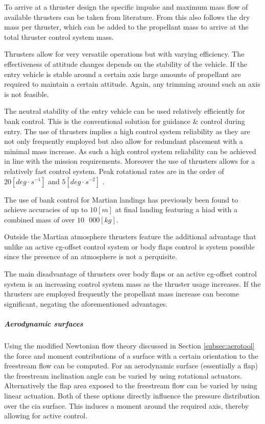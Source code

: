 To arrive at a thruster design the specific impulse and maximum mass flow of available thrusters can be taken from literature. From this also follows the dry mass per thruster, which can be added to the propellant mass to arrive at the total thruster control system mass.

Thrusters allow for very versatile operations but with varying efficiency. The effectiveness of attitude changes depends on the stability of the vehicle. If the entry vehicle is stable around a certain axis large amounts of propellant are required to maintain a certain attitude. Again, any trimming around such an axis is not feasible.

The neutral stability of the entry vehicle can be used relatively efficiently for bank control. This is the conventional solution for guidance \& control during entry. The use of thrusters implies a high control system reliability as they are not only frequently employed but also allow for redundant placement with a minimal mass increase. As such a high control system reliability can be achieved in line with the mission requirements. Moreover the use of thrusters allows for a relatively fast control system. Peak rotational rates are in the order of $20 \left[deg\cdot s^{-1}\right]$ and $5 \left[deg \cdot s^{-2}\right]$ \cite{Davis2010}.

The use of bank control for Martian landings has previously been found \cite{Davis2010} to achieve accuracies of up to $10 \left[m\right]$ at final landing featuring a \gls{hiad} with a combined mass of over $10\mbox{ }000 \left[kg\right]$.

Outside the Martian atmosphere thrusters feature the additional advantage that unlike an active \gls{cg}-offset control system or body flaps control is system possible since the presence of an atmosphere is not a perquisite.

The main disadvantage of thrusters over body flaps or an active \gls{cg}-offset control system is an increasing control system mass as the thruster usage increases. If the thrusters are employed frequently the propellant mass increase can become significant, negating the aforementioned advantages.


\subparagraph{Aerodynamic surfaces}

Using the modified Newtonian flow theory discussed in Section \ref{subsec:aerotool} the force and moment contributions of a surface with a certain orientation to the freestream flow can be computed. For an aerodynamic surface (essentially a flap) the freestream inclination angle can be varied by using rotational actuators. Alternatively the flap area exposed to the freestream flow can be varied by using linear actuation. Both of these options directly influence the pressure distribution over the \gls{cia} surface. This induces a moment around the required axis, thereby allowing for active control.

